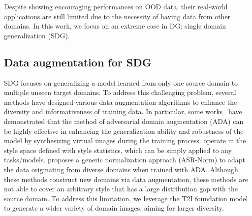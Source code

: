 Despite showing encouraging performances on OOD data, their real-world applications are still limited due to the necessity of having data from other domains.
In this work, we focus on an extreme case in DG: single domain generalization (SDG).
\subsection{Data augmentation for SDG}
SDG focuses on generalizing a model learned from only one source domain to multiple unseen target domains. 
To address this challenging problem, several methods have designed various data augmentation algorithms to enhance the diversity and informativeness of training data.
In particular, some works~\cite{qiao2020learning, volpi2019addressing, volpi2018generalizing, zhao2020maximum} have demonstrated that the method of adversarial domain augmentation (ADA) can be highly effective in enhancing the generalization ability and robustness of the model by synthesizing virtual images during the training process. \cite{zhou2021domain, wang2021learning} operate in the style space defined with style statistics, which can be simply applied to any tasks/models. 
\cite{fan2021adversarially} proposes a generic normalization approach (ASR-Norm) to adapt the data originating from diverse domains when trained with ADA.
Although these methods construct new domains via data augmentation, these methods are not able to cover an arbitrary style that has a large distribution gap with the source domain. 
To address this limitation, we leverage the T2I foundation model to generate a wider variety of domain images, aiming for larger diversity.

